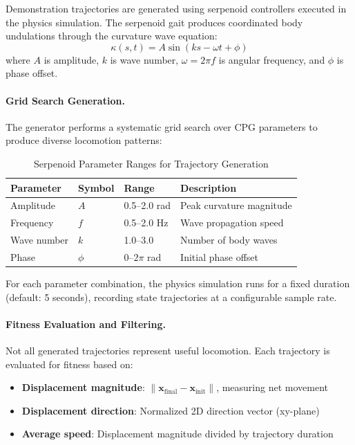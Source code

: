 \documentclass[11pt]{article}
\begin{document}
Demonstration trajectories are generated using serpenoid controllers executed in the physics simulation. The serpenoid gait produces coordinated body undulations through the curvature wave equation:
\begin{equation}
    \kappa(s, t) = A \sin(ks - \omega t + \phi)
\end{equation}
where $A$ is amplitude, $k$ is wave number, $\omega = 2\pi f$ is angular frequency, and $\phi$ is phase offset.

\paragraph{Grid Search Generation.}
The generator performs a systematic grid search over CPG parameters to produce diverse locomotion patterns:

\begin{table}[H]
\centering
\caption{Serpenoid Parameter Ranges for Trajectory Generation}
\begin{tabular}{@{}llll@{}}
\toprule
\textbf{Parameter} & \textbf{Symbol} & \textbf{Range} & \textbf{Description} \\
\midrule
Amplitude & $A$ & 0.5--2.0 rad & Peak curvature magnitude \\
Frequency & $f$ & 0.5--2.0 Hz & Wave propagation speed \\
Wave number & $k$ & 1.0--3.0 & Number of body waves \\
Phase & $\phi$ & 0--$2\pi$ rad & Initial phase offset \\
\bottomrule
\end{tabular}
\end{table}

For each parameter combination, the physics simulation runs for a fixed duration (default: 5 seconds), recording state trajectories at a configurable sample rate.

\paragraph{Fitness Evaluation and Filtering.}
Not all generated trajectories represent useful locomotion. Each trajectory is evaluated for fitness based on:
\begin{itemize}
    \item \textbf{Displacement magnitude}: $\|\mathbf{x}_{\text{final}} - \mathbf{x}_{\text{init}}\|$, measuring net movement
    \item \textbf{Displacement direction}: Normalized 2D direction vector (xy-plane)
    \item \textbf{Average speed}: Displacement magnitude divided by trajectory duration
\end{itemize}
\end{document}
